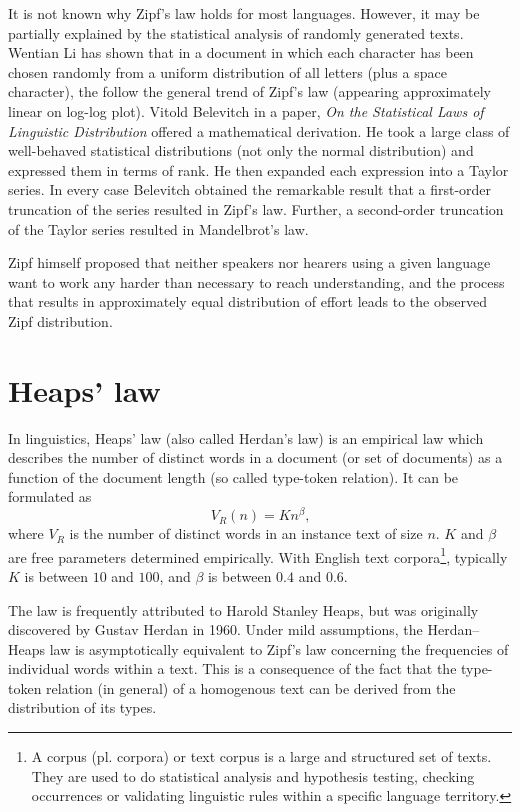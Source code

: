       It is not known why Zipf's law holds for most languages\cite{Brillouin2004}. However, it may be partially explained by the statistical analysis of randomly generated texts. Wentian Li has shown that in a document in which each character has been chosen randomly from a uniform distribution of all letters (plus a space character), the  follow the general trend of Zipf's law (appearing approximately linear on log-log plot)\cite{Li1992}. Vitold Belevitch in a paper, \emph{On the Statistical Laws of Linguistic Distribution} offered a mathematical derivation. He took a large class of well-behaved statistical distributions (not only the normal distribution) and expressed them in terms of rank. He then expanded each expression into a Taylor series. In every case Belevitch obtained the remarkable result that a first-order truncation of the series resulted in Zipf's law. Further, a second-order truncation of the Taylor series resulted in Mandelbrot's law\cite{Neumann2013,Belevitch1959}.

      Zipf himself proposed that neither speakers nor hearers using a given language want to work any harder than necessary to reach understanding, and the process that results in approximately equal distribution of effort leads to the observed Zipf distribution\cite{Zipf1949,CanchoSole2003}.
  
  \section{Heaps' law}
  
    In linguistics, Heaps' law (also called Herdan's law) is an empirical law which describes the number of distinct words in a document (or set of documents) as a function of the document length (so called type-token relation). It can be formulated as
    \begin{equation}
      V_R(n) = Kn^\beta\mbox{,}
    \end{equation}
    where $V_R$ is the number of distinct words in an instance text of size $n$. $K$ and $\beta$ are free parameters determined empirically. With English text corpora\footnote{A corpus (pl. corpora) or text corpus is a large and structured set of texts. They are used to do statistical analysis and hypothesis testing, checking occurrences or validating linguistic rules within a specific language territory.}, typically $K$ is between $10$ and $100$, and $\beta$ is between $0.4$ and $0.6$.

    The law is frequently attributed to Harold Stanley Heaps, but was originally discovered by Gustav Herdan in 1960\cite{Egghe2007}. Under mild assumptions, the Herdan–Heaps law is asymptotically equivalent to Zipf's law concerning the frequencies of individual words within a text\cite{Kornai1999}. This is a consequence of the fact that the type-token relation (in general) of a homogenous text can be derived from the distribution of its types\cite{Milicka2009}.

